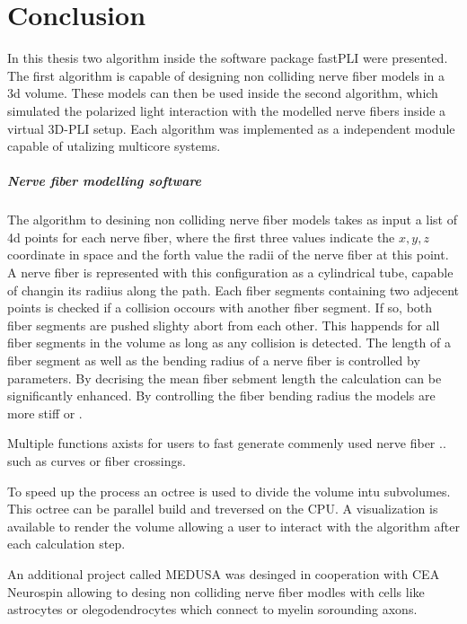 \chapter{Conclusion}
\label{sec:conclusion}
% 
In this thesis two algorithm inside the software package \ac{fastPLI} were presented.
The first algorithm is capable of designing non colliding nerve fiber models in a 3d volume.
These models can then be used inside the second algorithm, which simulated the polarized light interaction with the modelled nerve fibers inside a virtual \ac{3D-PLI} setup.
Each algorithm was implemented as a independent \python{} module capable of utalizing multicore systems.
% 
\paragraph{Nerve fiber modelling software}
The algorithm to desining non colliding nerve fiber models takes as input a list of 4d points for each nerve fiber, where the first three values indicate the $x,y,z$ coordinate in space and the forth value the radii of the nerve fiber at this point.
A nerve fiber is represented with this configuration as a cylindrical tube, capable of changin its radiius along the path.
Each fiber segments containing two adjecent points is checked if a collision occours with another fiber segment.
If so, both fiber segments are pushed slighty abort from each other.
This happends for all fiber segments in the volume as long as any collision is detected.
The length of a fiber segment as well as the bending radius of a nerve fiber is controlled by parameters.
By decrising the mean fiber sebment length the calculation can be significantly enhanced. 
By controlling the fiber bending radius the models are more stiff or \dummy{}.
\par
Multiple functions axists for users to fast generate commenly used nerve fiber  .. such as curves or fiber crossings.
% 
\par
% 
To speed up the process an octree is used to divide the volume intu subvolumes.
This octree can be parallel build and treversed on the \ac{CPU}.
A visualization is available to render the volume allowing a user to interact with the algorithm after each calculation step.
\par
% 
An additional project called \ac{MEDUSA} was desinged in cooperation with \ac{CEA} Neurospin allowing to desing non colliding nerve fiber modles with cells like astrocytes or olegodendrocytes which connect to myelin sorounding axons.
% 
% 
% 
